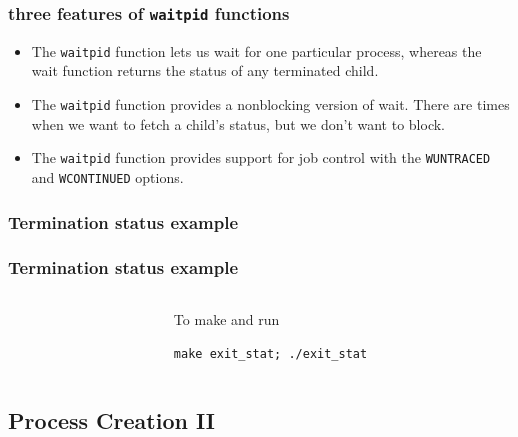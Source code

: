 \documentclass[newPxFont,sthlmFooter,nooffset]{beamer}
\begin{document}
\begin{frame}[t]
  \frametitle{three features of \texttt{waitpid} functions }
  \begin{itemize}
  \item The \texttt{waitpid} function lets us wait for one particular
    process, whereas the wait function returns the status of any
    terminated child.
  \item The \texttt{waitpid} function provides a nonblocking version
    of wait. There are times when we want to fetch a child’s status,
    but we don’t want to block.
  \item The \texttt{waitpid} function provides support for job control
    with the \texttt{WUNTRACED} and \texttt{WCONTINUED} options.
  \end{itemize}
\end{frame}

\begin{frame}[containsverbatim,t]
  \frametitle{Termination status example}

  

\end{frame}

\begin{frame}[containsverbatim,t]
  \frametitle{Termination status example}
  \begin{columns}
    \begin{column}{0.6\linewidth}
      
    \end{column}
    \begin{column}{0.35\linewidth}
      To make and run

     \texttt{make exit\_stat; ./exit\_stat}
    \end{column}
  \end{columns}
\end{frame}


\subsection{Process Creation II}
\end{document}

